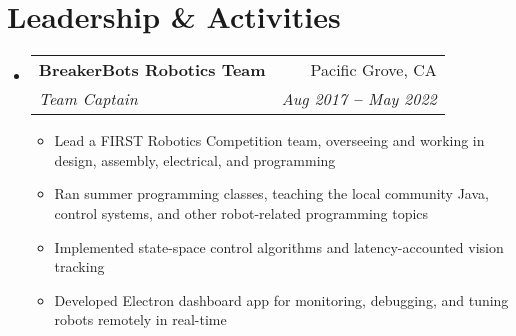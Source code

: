 \documentclass[12pt]{article}
\makeatletter
\newcommand{\entry}[1]{
  \item\small{
    {#1 \vspace{-2pt}}
  }
}
\newcommand{\subheading}[4]{
  \vspace{-2pt}\item
    \begin{tabular*}{0.97\textwidth}[t]{l@{\extracolsep{\fill}}r}
      \textbf{#1} & #2 \\
      \textit{\small#3} & \textit{\small #4} \\
    \end{tabular*}\vspace{-7pt}
}
\newcommand{\subheadingliststart}{\begin{itemize}[leftmargin=0.15in, label={}]}
\newcommand{\subheadinglistend}{\end{itemize}}
\newcommand{\entryliststart}{\begin{itemize}}
\newcommand{\entrylistend}{\end{itemize}\vspace{-5pt}}
\makeatother
\begin{document}
\section{Leadership \& Activities}
  \vspace{3pt}
  \subheadingliststart
    \subheading
      {BreakerBots Robotics Team}{Pacific Grove, CA}
      {Team Captain}{Aug 2017 \textbf{--} May 2022}
        \entryliststart
            \entry{Lead a FIRST Robotics Competition team, overseeing and working in design, assembly, electrical, and programming}
            \entry{Ran summer programming classes, teaching the local community Java, control systems, and other robot-related programming topics}
            \entry{Implemented state-space control algorithms and latency-accounted vision tracking}
            \entry{Developed Electron dashboard app for monitoring, debugging, and tuning robots remotely in real-time}
        \entrylistend
  \subheadinglistend
\end{document}
